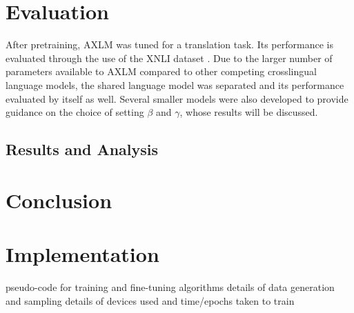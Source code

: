 \documentclass[10pt,letterpaper]{article}
\begin{document}
\begin{multicols}{2}
\section{Evaluation}
After pretraining, AXLM was tuned for a translation task.  Its performance is evaluated through the use of the XNLI dataset \cite{}.  Due to the larger number of parameters available to AXLM compared to other competing crosslingual language models, the shared language model was separated and its performance evaluated by itself as well.  Several smaller models were also developed to provide guidance on the choice of setting $\beta$ and $\gamma$, whose results will be discussed.

\subsection{Results and Analysis}

\section{Conclusion}

\nocite{*}



\section{Implementation}
pseudo-code for training and fine-tuning algorithms
details of data generation and sampling
details of devices used and time/epochs taken to train
\end{multicols}
\end{document}

